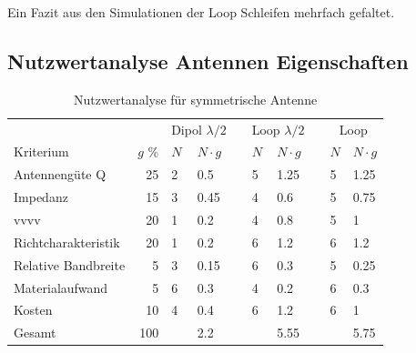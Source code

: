 Ein Fazit aus den Simulationen der Loop Schleifen mehrfach gefaltet.
\subsection{Nutzwertanalyse Antennen Eigenschaften  }
\begin{table}[htb]
  \centering
  \begin{tabular}{l r l l l l l l l l} \toprule 
  && \multicolumn{2}{c}{Dipol $\lambda/2$}   && \multicolumn{2}{c}{Loop $\lambda/2$}   && \multicolumn{2}{c}{Loop} \\ \cmidrule{3-4} \cmidrule{6-7} \cmidrule{9-10}
  Kriterium                  & $g$ \%  & $N$ & $N\cdot g$               && $N$ & $N\cdot g$                  && $N$ & $N\cdot g$ \\ \midrule
  Antennengüte Q            &  25             & 2   & 0.5               && 5   & 1.25                        && 5   & 1.25 \\
  Impedanz                  &  15             & 3   & 0.45              && 4   & 0.6                         && 5   & 0.75 \\
  vvvv    &  20             & 1   & 0.2               && 4   & 0.8                         && 5   & 1 \\
  Richtcharakteristik       &  20             & 1   & 0.2               && 6   & 1.2                         && 6   & 1.2 \\
  Relative Bandbreite       &   5             & 3   & 0.15              && 6   & 0.3                         && 5   & 0.25 \\
  Materialaufwand           &   5             & 6   & 0.3               && 4   & 0.2                         && 6   & 0.3 \\
  Kosten                    &  10             & 4   & 0.4               && 6   & 1.2                         && 6   & 1 \\
  Gesamt                    & 100             &     & 2.2               &&     & 5.55                        &&     & 5.75 \\ \bottomrule
  \end{tabular}
  \caption{Nutzwertanalyse für symmetrische Antenne}
  \label{nutzwertEvaluation}
\end{table}